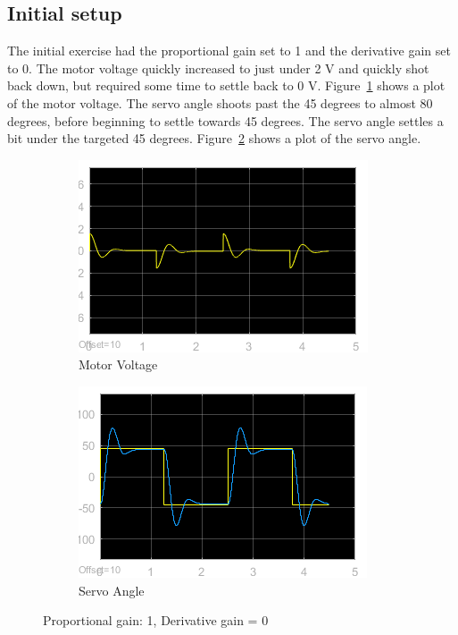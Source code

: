 \documentclass[12pt]{article}
\begin{document}
\subsection*{Initial setup} %
The initial exercise had the proportional gain set to 1 and the derivative gain set to 0. The motor voltage quickly increased to just under 2 V and quickly shot back down, but required some time to settle back to 0 V. Figure~\ref{fig:vii_volt} shows a plot of the motor voltage. The servo angle shoots past the 45 degrees to almost 80 degrees, before beginning to settle towards 45 degrees. The servo angle settles a bit under the targeted 45 degrees. Figure~\ref{fig:vii_angle} shows a plot of the servo angle.
\begin{figure}[h!]
    \centering
    \begin{subfigure}[b]{0.46\textwidth}
        \includegraphics[width=\textwidth]{vii_voltage}    
        \caption{\label{fig:vii_volt}Motor Voltage}    
    \end{subfigure}
    \begin{subfigure}[b]{0.46\textwidth}
        \includegraphics[width=\textwidth]{vii_angle}
        \caption{\label{fig:vii_angle}Servo Angle}
    \end{subfigure}
    \caption{\label{fig:vii}Proportional gain: 1, Derivative gain = 0}
\end{figure}
\end{document}
